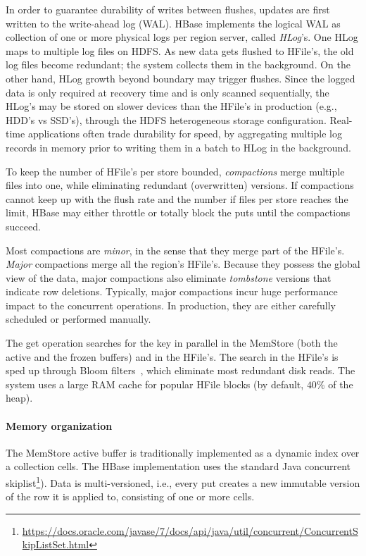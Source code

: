 In order to guarantee durability of writes between flushes, updates are first written to 
the write-ahead log (WAL). HBase implements the logical WAL as collection of one or more physical 
logs per region server, called \emph{HLog}'s. One HLog maps to multiple log files on HDFS. 
As new data gets flushed to HFile's, the old log files become redundant; the system collects 
them in the background. On the other hand, HLog growth beyond boundary may trigger flushes. 
Since the logged data is only required at recovery time and is only scanned sequentially, the HLog's 
may be stored on slower devices than the HFile's in production (e.g., HDD's vs SSD's),
through the HDFS heterogeneous storage configuration. Real-time applications often 
trade durability for speed, by aggregating multiple log records in memory prior to writing 
them in a batch to HLog in the background. 

To keep the number of HFile's per store bounded, \emph{compactions} merge multiple files 
into one, while eliminating redundant (overwritten) versions. If compactions cannot keep up
with the flush rate and the number if files per store reaches the limit, HBase may either throttle 
or totally block the puts until the compactions succeed. 

Most compactions are \emph{minor}, 
in the sense that they merge part of the HFile's. \emph{Major} compactions merge all the region's 
HFile's. Because they possess the global view of the data, major compactions also eliminate 
{\em tombstone} versions that indicate row deletions. Typically, major compactions incur huge 
performance impact to the concurrent operations. In production, they are either carefully scheduled 
or performed manually. 

The get operation searches for the key in parallel in the MemStore (both the active and the 
frozen buffers) and in the HFile's. The search in the HFile's is sped up through Bloom 
filters~\cite{Chang2008}, which eliminate most redundant disk reads. The system 
uses a large RAM cache for popular HFile blocks (by default, $40\%$ of the heap).

\paragraph{Memory organization}
The MemStore active buffer is traditionally implemented as a dynamic index over a collection cells.  
The HBase implementation uses the standard Java concurrent skiplist\footnote{\small{\url{https://docs.oracle.com/javase/7/docs/api/java/util/concurrent/ConcurrentSkipListSet.html}}}).
Data is multi-versioned, i.e., every put creates a new immutable version of the row it is applied to, 
consisting of one or more cells. 

